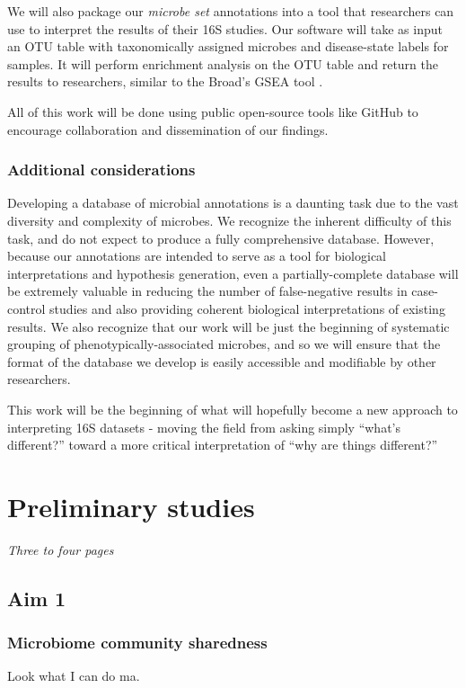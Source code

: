 \documentclass[12pt]{article}
\begin{document}
We will also package our \textit{microbe set} annotations into a tool 
that researchers can use to interpret the results of their 16S 
studies. Our software will take as input an OTU table with 
taxonomically assigned microbes and disease-state labels for samples. 
It will perform enrichment analysis on the OTU table and return the 
results to researchers, similar to the Broad's GSEA tool \cite{subramanian-gsea-2005}.

All of this work will be done using public open-source tools like 
GitHub to encourage collaboration and dissemination of our findings.

\subsubsection{Additional considerations}
Developing a database of microbial annotations is a daunting task due 
to the vast diversity and complexity of microbes. We recognize the 
inherent difficulty of this task, and do not expect to produce a fully 
comprehensive database. However, because our annotations are intended 
to serve as a tool for biological interpretations and hypothesis 
generation, even a partially-complete database will be extremely 
valuable in reducing the number of false-negative results in case-
control studies and also providing coherent biological interpretations 
of existing results. We also recognize that our work will be just the 
beginning of systematic grouping of phenotypically-associated 
microbes, and so we will ensure that the format of the database we 
develop is easily accessible and modifiable by other researchers.

This work will be the beginning of what will hopefully become a new 
approach to interpreting 16S datasets - moving the field from asking 
simply ``what's different?'' toward a more critical interpretation of 
``why are things different?''

\section{Preliminary studies}
\textit{Three to four pages}

\subsection{Aim 1}
\subsubsection{Microbiome community sharedness}
Look what I can do ma.
\end{document}
